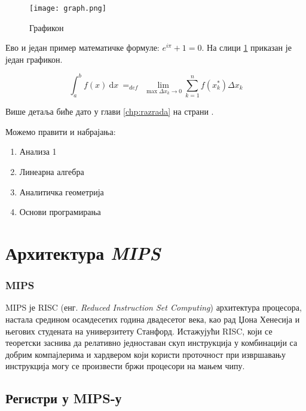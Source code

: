 \documentclass[12pt,oneside]{memoir}
\begin{document}
\begin{figure}[!ht]
  \centering
  \texttt{[image: graph.png]}
  \caption{Графикон}
  \label{fig:grafikon}
\end{figure}

Ево и један пример математичке формуле: $e^{i\pi} + 1 = 0$. 
На слици \ref{fig:grafikon} приказан је један графикон.

$$
\int_a^b f(x)\ \mathrm{d}x \ =_{def}\ \lim_{\max{\Delta x_k \rightarrow 0}} \sum_{k=1}^n f(x_k^*)\Delta x_k
$$

Више детаља биће дато у глави \ref{chp:razrada} на страни \pageref{chp:razrada}.

Можемо правити и набрајања:
\begin{enumerate}
\item Анализа 1
\item Линеарна алгебра
\item Аналитичка геометрија
\item Основи програмирања
\end{enumerate}

\pangrami

\chapter{Архитектура \textit{MIPS}}
\label{chp:mips}
\subsection{MIPS}
MIPS је RISC (енг. \textit{Reduced Instruction Set Computing}) архитектура процесора, настала средином осамдесетих година двадесетог века, као рад Џона Хенесија и његових студената на универзитету Станфорд. Истажујући RISC, који се теоретски заснива да релативно једноставан скуп инструкција у комбинацији са добрим компајлерима и хардвером који користи проточност при извршавању инструкција могу се произвести бржи процесори на мањем чипу. 

\section{Регистри у MIPS-у}
\end{document}
